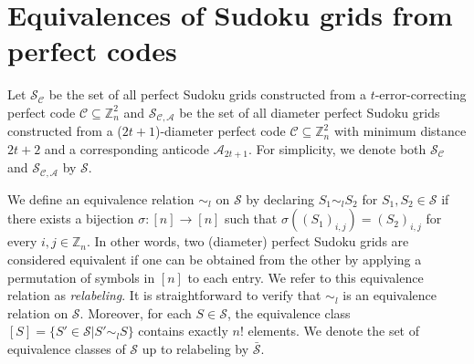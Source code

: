 \documentclass{article}
\theoremstyle{definition}
\begin{document}
\section{Equivalences of Sudoku grids from perfect codes}
Let $\mathcal{S}_\mathcal{C}$ be the set of all perfect Sudoku grids constructed from a $t$-error-correcting perfect code $\mathcal{C}\subseteq\mathbb{Z}_n^2$ and $\mathcal{S}_{\mathcal{C},\mathcal{A}}$ be the set of all diameter perfect Sudoku grids constructed from a ($2t+1$)-diameter perfect code $\mathcal{C}\subseteq \mathbb{Z}_n^2$ with minimum distance $2t+2$ and a corresponding anticode $\mathcal{A}_{2t+1}$. For simplicity, we denote both $\mathcal{S}_\mathcal{C}$ and $\mathcal{S}_{\mathcal{C},\mathcal{A}}$ by $\mathcal{S}$.

We define an equivalence relation $\sim_l$ on $\mathcal{S}$ by declaring $S_1\sim_l S_2$ for $S_1, S_2\in\mathcal{S}$ if there exists a bijection $\sigma:[n]\to[n]$ such that $\sigma((S_1)_{i, j})=(S_2)_{i, j}$ for every $i, j\in\mathbb{Z}_n$. In other words, two (diameter) perfect Sudoku grids are considered equivalent if one can be obtained from the other by applying a permutation of symbols in $[n]$ to each entry. We refer to this equivalence relation as \textit{relabeling}. It is straightforward to verify that $\sim_l$ is an equivalence relation on $\mathcal{S}$. Moreover, for each $S\in \mathcal{S}$, the equivalence class $[S]=\{S'\in \mathcal{S}|S'\sim_l S\}$ contains exactly $n!$ elements. We denote the set of equivalence classes of $\mathcal{S}$ up to relabeling by $\bar{\mathcal{S}}$.
\end{document}
